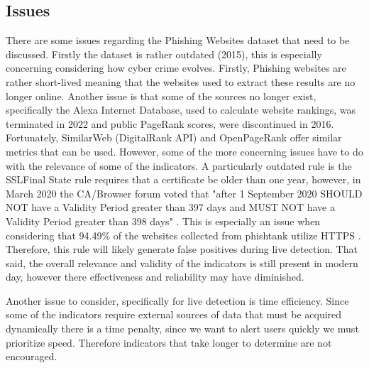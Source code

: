 \documentclass{sigkddExp}
\begin{document}
\subsection{Issues}
There are some issues regarding the Phishing Websites dataset that need to be discussed. Firstly the dataset is rather outdated (2015), this is especially concerning considering how cyber crime evolves. Firstly, Phishing websites are rather short-lived meaning that the websites used to extract these results are no longer online. Another issue is that some of the sources no longer exist, specifically the Alexa Internet Database, used to calculate website rankings, was terminated in 2022 and public PageRank scores, were discontinued in 2016. Fortunately, SimilarWeb (DigitalRank API) and OpenPageRank offer similar metrics that can be used. However, some of the more concerning issues have to do with the relevance of some of the indicators. A particularly outdated rule is the SSLFinal State rule requires that a certificate be older than one year, however, in March 2020 the CA/Browser forum voted that "after 1 September 2020 SHOULD NOT have a Validity Period greater than 397 days and MUST NOT have a Validity Period greater than 398 days" \cite{cabforum2020}. This is especially an issue when considering that 94.49\% of the websites collected from phishtank utilize HTTPS . Therefore, this rule will likely generate false positives during live detection. That said, the overall relevance and validity of the indicators is still present in modern day, however there effectiveness and reliability may have diminished.

\vspace{1em}

Another issue to consider, specifically for live detection is time efficiency. Since some of the indicators require external sources of data that must be acquired dynamically there is a time penalty, since we want to alert users quickly we must prioritize speed. Therefore indicators that take longer to determine are not encouraged.
\end{document}
